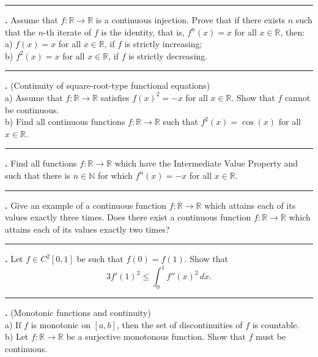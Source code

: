 \documentclass[11pt]{article}
\newcounter{probnum}
\newenvironment{problembox}{\par\noindent\rule{\linewidth}{0.5pt}\vspace{5pt}\par}{\vspace{2pt}}
\begin{document}
\begin{problembox}
\textbf{\theprobnum.} Assume that $f : \mathbb{R} \to \mathbb{R}$ is a continuous injection. Prove that if there exists $n$ such that the $n$-th iterate of $f$ is the identity, that is, $f^n(x) = x$ for all $x \in \mathbb{R}$, then:\\
a) $f(x) = x$ for all $x \in \mathbb{R}$, if $f$ is strictly increasing;\\
b) $f^2(x) = x$ for all $x \in \mathbb{R}$, if $f$ is strictly decreasing.
\end{problembox}

\begin{problembox}
\textbf{\theprobnum.} (Continuity of square-root-type functional equations)\\
a) Assume that $f : \mathbb{R} \to \mathbb{R}$ satisfies $f(x)^2 = -x$ for all $x \in \mathbb{R}$. Show that $f$ cannot be continuous.\\
b) Find all continuous functions $f : \mathbb{R} \to \mathbb{R}$ such that $f^2(x) = \cos(x)$ for all $x \in \mathbb{R}$.
\end{problembox}

\begin{problembox}
\textbf{\theprobnum.} Find all functions $f : \mathbb{R} \to \mathbb{R}$ which have the Intermediate Value Property and such that there is $n \in \mathbb{N}$ for which $f^n(x) = -x$ for all $x \in \mathbb{R}$.
\end{problembox}

\begin{problembox}
\textbf{\theprobnum.} Give an example of a continuous function $f : \mathbb{R} \to \mathbb{R}$ which attains each of its values exactly three times. Does there exist a continuous function $f : \mathbb{R} \to \mathbb{R}$ which attains each of its values exactly two times?
\end{problembox}

\begin{problembox}
\textbf{\theprobnum.} Let $f \in C^2[0,1]$ be such that $f(0) = f(1)$. Show that
\[
3 f'(1)^2 \le \int_0^1 f''(x)^2\,dx.
\]
\end{problembox}

\begin{problembox}
\textbf{\theprobnum.} (Monotonic functions and continuity)\\
a) If $f$ is monotonic on $[a,b]$, then the set of discontinuities of $f$ is countable.\\
b) Let $f : \mathbb{R} \to \mathbb{R}$ be a surjective monotonous function. Show that $f$ must be continuous.
\end{problembox}
\end{document}
